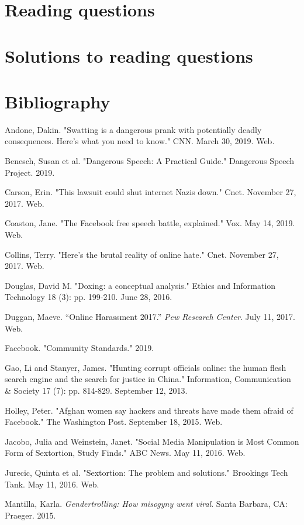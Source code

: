 \documentclass[class=book, crop=false]{standalone}
\begin{document}
\section{Reading questions}

\section{Solutions to reading questions}

\section{Bibliography}

Andone, Dakin. "Swatting is a dangerous prank with potentially deadly consequences. Here's what you need to know." CNN. March 30, 2019. Web.

Benesch, Susan et al. "Dangerous Speech: A Practical Guide." Dangerous Speech Project. 2019.

Carson, Erin. "This lawsuit could shut internet Nazis down." Cnet. November 27, 2017. Web.

Coaston, Jane. "The Facebook free speech battle, explained." Vox. May 14, 2019. Web.

Collins, Terry. "Here's the brutal reality of online hate." Cnet. November 27, 2017. Web.

Douglas, David M. "Doxing: a conceptual analysis." Ethics and Information Technology 18 (3): pp. 199-210. June 28, 2016.

Duggan, Maeve. “Online Harassment 2017.” \textit{Pew Research Center}. July 11, 2017. Web.

Facebook. "Community Standards." 2019.

Gao, Li and Stanyer, James. "Hunting corrupt officials online: the human flesh search engine and the search for justice in China." Information, Communication \& Society 17 (7): pp. 814-829. September 12, 2013.

Holley, Peter. "Afghan women say hackers and threats have made them afraid of Facebook." The Washington Post. September 18, 2015. Web.

Jacobo, Julia and Weinstein, Janet. "Social Media Manipulation is Most Common Form of Sextortion, Study Finds." ABC News. May 11, 2016. Web.

Jurecic, Quinta et al. "Sextortion: The problem and solutions." Brookings Tech Tank. May 11, 2016. Web.

Mantilla, Karla. \textit{Gendertrolling: How misogyny went viral}. Santa Barbara, CA: Praeger. 2015.
\end{document}
